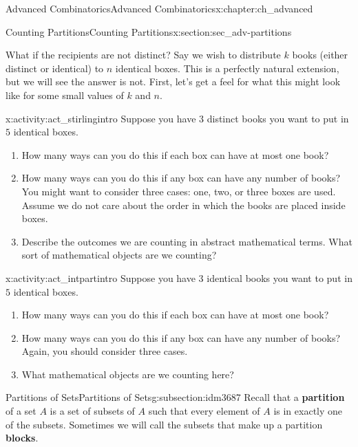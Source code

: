 \documentclass[oneside,10pt,]{book}
\newcommand{\terminology}[1]{\textbf{#1}}
\numberwithin{equation}{chapter}
\begin{document}
\begin{chapterptx}{Advanced Combinatorics}{}{Advanced Combinatorics}{}{}{x:chapter:ch_advanced}
\begin{sectionptx}{Counting Partitions}{}{Counting Partitions}{}{}{x:section:sec_adv-partitions}
\begin{introduction}{}
\par
What if the recipients are not distinct?  Say we wish to distribute \(k\) books (either distinct or identical) to \(n\) identical boxes.  This is a perfectly natural extension, but we will see the answer is not.  First, let's get a feel for what this might look like for some small values of \(k\) and \(n\).%
\begin{activity}{}{x:activity:act_stirlingintro}%
Suppose you have \(3\) distinct books you want to put in \(5\) identical boxes.%
\begin{enumerate}[font=\bfseries,label=(\alph*),ref=\alph*]
\item{}How many ways can you do this if each box can have at most one book?%
\item{}How many ways can you do this if any box can have any number of books?  You might want to consider three cases: one, two, or three boxes are used.  Assume we do not care about the order in which the books are placed inside boxes.%
\item{}Describe the outcomes we are counting in abstract mathematical terms.  What sort of mathematical objects are we counting?%
\end{enumerate}
\end{activity}
\begin{activity}{}{x:activity:act_intpartintro}%
Suppose you have \(3\) identical books you want to put in \(5\) identical boxes.%
\begin{enumerate}[font=\bfseries,label=(\alph*),ref=\alph*]
\item{}How many ways can you do this if each box can have at most one book?%
\item{}How many ways can you do this if any box can have any number of books?  Again, you should consider three cases.%
\item{}What mathematical objects are we counting here?%
\end{enumerate}
\end{activity}
\end{introduction}%
%
%
\typeout{************************************************}
\typeout{************************************************}
%
\begin{subsectionptx}{Partitions of Sets}{}{Partitions of Sets}{}{}{g:subsection:idm3687}
Recall that a \terminology{partition} of a set \(A\) is a set of subsets of \(A\) such that every element of \(A\) is in exactly one of the subsets.  Sometimes we will call the subsets that make up a partition \terminology{blocks}.%

\end{subsectionptx}
\end{sectionptx}
\end{chapterptx}
\end{document}
